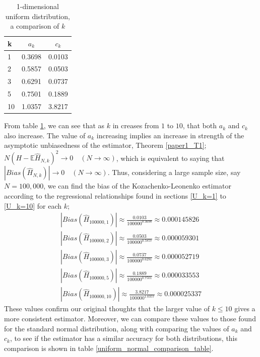 \documentclass{report}
\begin{document}
\begin{table}
\caption{1-dimensional uniform distribution, a comparison of $k$} \label{uniform_k_comparison_table}
\begin{center}
\begin{tabular}{| l | c c|} 
\toprule
k & $a_{k}$ & $c_{k}$ \\
\midrule[1pt]
1 & 0.3698 & 0.0103 \\
2 & 0.5857 & 0.0503 \\
3 & 0.6291 & 0.0737 \\
5 & 0.7501 & 0.1889 \\
10 & 1.0357 &  3.8217 \\
\hline
\end{tabular}
\end{center}
\end{table}

From table \ref{uniform_k_comparison_table}, we can see that as $k$ in creases from $1$ to $10$, that both $a_{k}$ and $c_{k}$ also increase. The value of $a_{k}$ increasing implies an increase in strength of the asymptotic unbiasedness of the estimator, Theorem \ref{paper1_T1};  $N (H - \mathbb{E}{\hat{H}_{N, k}})^2 \to 0 \quad  (N \to \infty)$, which is equivalent to saying that $|Bias(\hat{H}_{N, k})| \to 0 \quad (N \to \infty)$. Thus, considering a large sample size, say $N=100,000$, we can find the bias of the Kozachenko-Leonenko estimator according to the regressional relationships found in sections \ref{U_k=1} to \ref{U_k=10} for each $k$;
\begin{gather*}
|Bias(\hat{H}_{100000, 1})| \approx  \frac{0.0103}{100000^{0.3698}}   \approx 0.000145826 \\
|Bias(\hat{H}_{100000, 2})| \approx  \frac{0.0503}{100000^{0.5857}}   \approx 0.000059301 \\
|Bias(\hat{H}_{100000, 3})| \approx  \frac{0.0737}{100000^{0.6291}}   \approx 0.000052719 \\
|Bias(\hat{H}_{100000, 5})| \approx  \frac{0.1889}{100000^{0.7501}}   \approx 0.000033553\\
|Bias(\hat{H}_{100000, 10})| \approx  \frac{3.8217}{100000^{1.0357}}  \approx 0.000025337
\end{gather*}
These values confirm our original thoughts that the larger value of $k \leq 10$ gives a more consistent estimator. Moreover, we can compare these values to those found for the standard normal distribution, along with comparing the values of $a_{k}$ and $c_{k}$, to see if the estimator has a similar accuracy for both distributions, this comparison is shown in table \ref{uniform_normal_comparison_table}.
\end{document}
